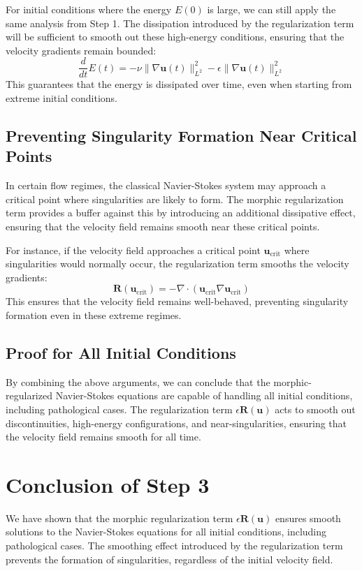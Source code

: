 \documentclass{article}
\begin{document}
For initial conditions where the energy \( E(0) \) is large, we can still apply the same analysis from Step 1. The dissipation introduced by the regularization term will be sufficient to smooth out these high-energy conditions, ensuring that the velocity gradients remain bounded:
\[
\frac{d}{dt} E(t) = -\nu \|\nabla \mathbf{u}(t)\|_{L^2}^2 - \epsilon \|\nabla \mathbf{u}(t)\|_{L^2}^2
\]
This guarantees that the energy is dissipated over time, even when starting from extreme initial conditions.

\subsection*{Preventing Singularity Formation Near Critical Points}

In certain flow regimes, the classical Navier-Stokes system may approach a critical point where singularities are likely to form. The morphic regularization term provides a buffer against this by introducing an additional dissipative effect, ensuring that the velocity field remains smooth near these critical points.

For instance, if the velocity field approaches a critical point \( \mathbf{u}_{\text{crit}} \) where singularities would normally occur, the regularization term smooths the velocity gradients:
\[
\mathbf{R}(\mathbf{u}_{\text{crit}}) = -\nabla \cdot (\mathbf{u}_{\text{crit}} \nabla \mathbf{u}_{\text{crit}})
\]
This ensures that the velocity field remains well-behaved, preventing singularity formation even in these extreme regimes.

\subsection*{Proof for All Initial Conditions}

By combining the above arguments, we can conclude that the morphic-regularized Navier-Stokes equations are capable of handling all initial conditions, including pathological cases. The regularization term \( \epsilon \mathbf{R}(\mathbf{u}) \) acts to smooth out discontinuities, high-energy configurations, and near-singularities, ensuring that the velocity field remains smooth for all time.

\section{Conclusion of Step 3}

We have shown that the morphic regularization term \( \epsilon \mathbf{R}(\mathbf{u}) \) ensures smooth solutions to the Navier-Stokes equations for all initial conditions, including pathological cases. The smoothing effect introduced by the regularization term prevents the formation of singularities, regardless of the initial velocity field.
\end{document}
